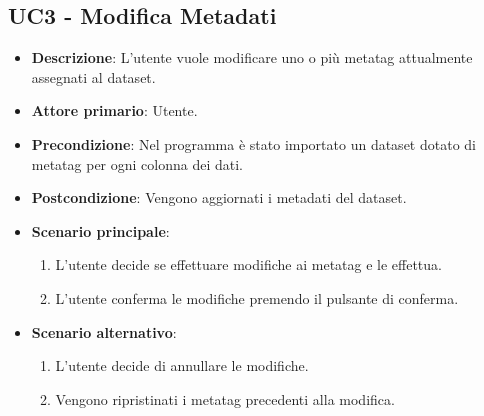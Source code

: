 \newpage
\subsection{UC3 - Modifica Metadati}
\label{subsec:uc3}


\begin{itemize}
    \item \textbf{Descrizione}: L’utente vuole modificare uno o più metatag attualmente assegnati al dataset.
	
    \item \textbf{Attore primario}: Utente.
    
    \item \textbf{Precondizione}:   Nel programma è stato importato un dataset dotato di metatag 
                                    per ogni colonna dei dati.

    \item \textbf{Postcondizione}:  Vengono aggiornati i metadati del dataset.

	\item \textbf{Scenario principale}:
		\begin{enumerate}
			\item L'utente decide se effettuare modifiche ai metatag e le effettua.
			\item L'utente conferma le modifiche premendo il pulsante di conferma.
        \end{enumerate}
    \item \textbf{Scenario alternativo}:
		\begin{enumerate}
			\item L'utente decide di annullare le modifiche.
			\item Vengono ripristinati i metatag precedenti alla modifica.
        \end{enumerate}

    
    

\end{itemize}
